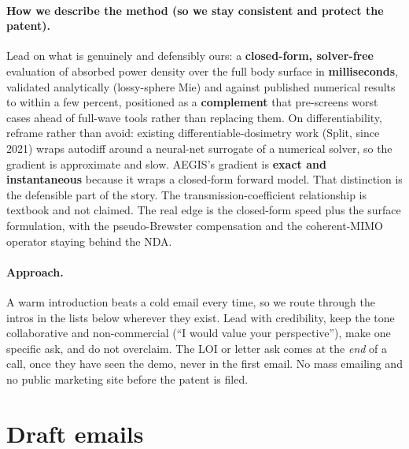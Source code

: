 \documentclass[11pt,a4paper]{article}
\begin{document}
\paragraph{How we describe the method (so we stay consistent and protect the patent).}
Lead on what is genuinely and defensibly ours: a \textbf{closed-form, solver-free} evaluation of absorbed
power density over the full body surface in \textbf{milliseconds}, validated analytically (lossy-sphere Mie)
and against published numerical results to within a few percent, positioned as a \textbf{complement} that
pre-screens worst cases ahead of full-wave tools rather than replacing them. On differentiability, reframe
rather than avoid: existing differentiable-dosimetry work (Split, since 2021) wraps autodiff around a
neural-net surrogate of a numerical solver, so the gradient is approximate and slow. AEGIS's gradient is
\textbf{exact and instantaneous} because it wraps a closed-form forward model. That distinction is the
defensible part of the story. The transmission-coefficient relationship is textbook and not claimed. The
real edge is the closed-form speed plus the surface formulation, with the pseudo-Brewster compensation and
the coherent-MIMO operator staying behind the NDA.

\paragraph{Approach.} A warm introduction beats a cold email every time, so we route through the intros in
the lists below wherever they exist. Lead with credibility, keep the tone collaborative and non-commercial
(``I would value your perspective''), make one specific ask, and do not overclaim. The LOI or letter ask
comes at the \emph{end} of a call, once they have seen the demo, never in the first email. No mass emailing
and no public marketing site before the patent is filed.

\section{Draft emails}
\end{document}

